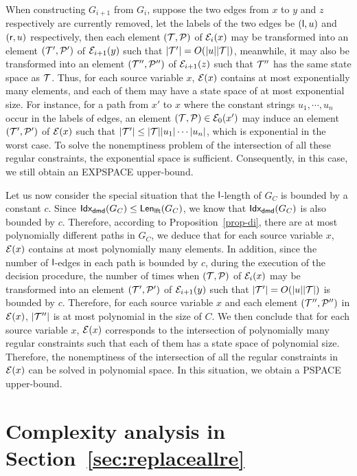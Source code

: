 When constructing $G_{i+1}$ from $G_i$, suppose the two edges from $x$ to $y$ and $z$ respectively are currently removed, let the labels of the two edges be $({\sf l}, u)$ and $({\sf r}, u)$ respectively, then each element $(\mathcal{T}, \mathcal{P})$ of $\mathcal{E}_i(x)$ may be transformed into an element $(\mathcal{T}', \mathcal{P}')$ of $\mathcal{E}_{i+1}(y)$ such that $|\mathcal{T}'| = O(|u||\mathcal{T}|)$, meanwhile, it may also be transformed into an element $(\mathcal{T}'', \mathcal{P}'')$ of $\mathcal{E}_{i+1}(z)$ such that $\mathcal{T}''$ has the same state space as $\mathcal{T}$. Thus, for each source variable $x$, $\mathcal{E}(x)$ contains at most exponentially many elements, and each of them may have a state space of at most exponential size. For instance, for a path from $x'$ to $x$ where the constant strings $u_1,\cdots, u_n$ occur in the labels of edges, an element $(\mathcal{T},\mathcal{P}) \in \mathcal{E}_0(x')$ may induce an element $(\mathcal{T}', \mathcal{P}')$ of $\mathcal{E}(x)$ such that $|\mathcal{T}'| \le |\mathcal{T}| |u_1| \cdots |u_n|$, which is exponential in the worst case. 
%
To solve the nonemptiness problem of the intersection of all these regular constraints, the exponential space is sufficient. Consequently, in this case, we still obtain an EXPSPACE upper-bound. 

Let us now consider the special situation that the $\mathsf{l}$-length of $G_C$ is bounded by a constant $c$.
Since ${\sf Idx_{dmd}}(G_C) \le {\sf Len_{lft}}(G_C)$, we know that ${\sf Idx_{dmd}}(G_C)$ is also bounded by $c$. Therefore, according to Proposition~\ref{prop-di}, there are at most polynomially different paths in $G_C$, we deduce that for each source variable $x$, $\mathcal{E}(x)$ contains at most polynomially many elements. In addition, since the number of $\mathsf{l}$-edges in each path is bounded by $c$, during the execution of the decision procedure, the number of times when $(\mathcal{T}, \mathcal{P})$ of $\mathcal{E}_i(x)$ may be transformed into an element $(\mathcal{T}', \mathcal{P}')$ of $\mathcal{E}_{i+1}(y)$ such that $|\mathcal{T}'| = O(|u||\mathcal{T}|)$ is bounded by $c$.
Therefore, for each source variable $x$ and each element $(\mathcal{T}'', \mathcal{P}'')$ in $\mathcal{E}(x)$,  $|\mathcal{T}''|$ is at most polynomial in the size of $C$. We then conclude that for each source variable $x$, $\mathcal{E}(x)$ corresponds to the intersection of polynomially many regular constraints such that each of them has a state space of polynomial size. Therefore, the nonemptiness of the intersection of all the regular constraints in $\mathcal{E}(x)$ can be solved in polynomial space. In this situation, we obtain a PSPACE upper-bound.


\def\refsecreplaceallre{\ref{sec:replaceallre}}
\section{Complexity analysis in Section~\protect\refsecreplaceallre}
\label{sec:re-complexity-full}

